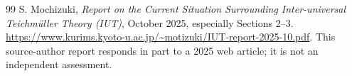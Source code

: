 \documentclass[11pt]{article}
\begin{document}
\begin{thebibliography}{99}
S. Mochizuki, \emph{Report on the Current Situation Surrounding Inter-universal Teichm\"uller Theory (IUT)}, October 2025, especially Sections 2--3. \url{https://www.kurims.kyoto-u.ac.jp/~motizuki/IUT-report-2025-10.pdf}. This source-author report responds in part to a 2025 web article; it is not an independent assessment.
\end{thebibliography}
\end{document}
